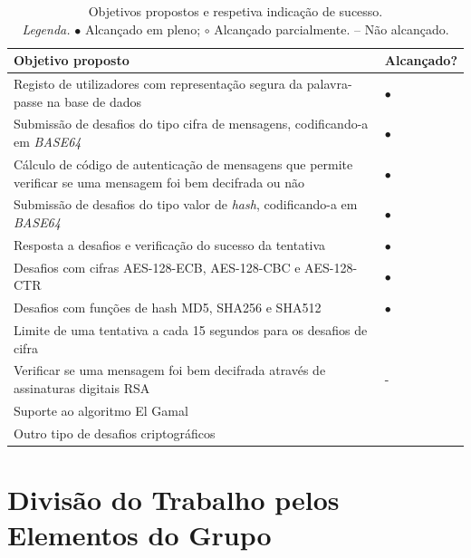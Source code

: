 \begin{table}[!htbp]
	\centering
	\begin{tabular}{p{} >{\centering\let\newline\\\arraybackslash\hspace{0pt}}m{}}
		\toprule
		{\bfseries Objetivo proposto} & {\bfseries Alcançado?} \\
		\midrule
		Registo de utilizadores com representação segura da palavra-passe na base de dados & $\bullet$ \\
		Submissão de desafios do tipo cifra de mensagens, codificando-a em \textit{BASE64} & $\bullet$ \\	
		Cálculo de código de autenticação de mensagens que permite verificar se uma mensagem foi bem decifrada ou não & $\bullet$ \\
		Submissão de desafios do tipo valor de \textit{hash}, codificando-a em \textit{BASE64} & $\bullet$ \\
		Resposta a desafios e verificação do sucesso da tentativa  & $\bullet$ \\
		Desafios com cifras AES-128-ECB, AES-128-CBC e AES-128-CTR & $\bullet$ \\
		Desafios com funções de hash MD5, SHA256 e SHA512          & $\bullet$ \\
		Limite de uma tentativa a cada 15 segundos para os desafios de cifra &  \\
		Verificar se uma mensagem foi bem decifrada através de assinaturas digitais RSA & - \\
		Suporte ao algoritmo El Gamal                                           & \\
		Outro tipo de desafios criptográficos                                   & \\
		\bottomrule
	\end{tabular}
	\caption[Objetivos propostos vs. alcançados]{
		Objetivos propostos e respetiva indicação de sucesso.\\
		\textit{Legenda.} $\bullet$ Alcançado em pleno; $\circ$ Alcançado parcialmente. -- Não alcançado.
	}
	\label{tab::objetivos}
\end{table}



\section{Divisão do Trabalho pelos Elementos do Grupo}
\label{chap4:sec:divisao}

